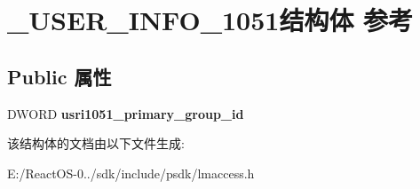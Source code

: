 \hypertarget{struct___u_s_e_r___i_n_f_o__1051}{}\section{\+\_\+\+U\+S\+E\+R\+\_\+\+I\+N\+F\+O\+\_\+1051结构体 参考}
\label{struct___u_s_e_r___i_n_f_o__1051}
\subsection*{Public 属性}
\begin{DoxyCompactItemize}
\item 
\mbox{\label{struct___u_s_e_r___i_n_f_o__1051_a2f9be4e6e38d8f3960ce63afe8460b01}} 
D\+W\+O\+RD {\bfseries usri1051\+\_\+primary\+\_\+group\+\_\+id}
\end{DoxyCompactItemize}


该结构体的文档由以下文件生成\+:\begin{DoxyCompactItemize}
\item 
E\+:/\+React\+O\+S-\/0../sdk/include/psdk/lmaccess.\+h\end{DoxyCompactItemize}
